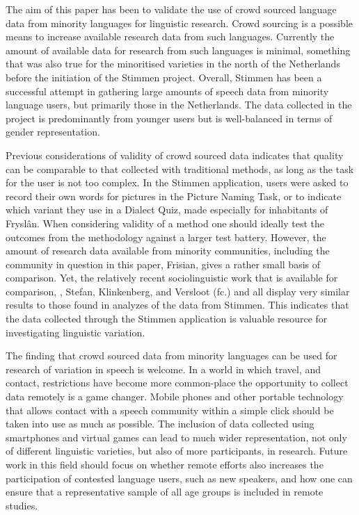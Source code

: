 \documentclass[output=paper,hidelinks]{langscibook}
\begin{document}
The aim of this paper has been to validate the use of crowd sourced language data from minority languages for linguistic research. Crowd sourcing is a possible means to increase available research data from such languages. Currently the amount of available data for research from such languages is minimal, something that was also true for the minoritised varieties in the north of the Netherlands before the initiation of the Stimmen project. Overall, Stimmen has been a successful attempt in gathering large amounts of speech data from minority language users, but primarily those in the Netherlands. The data collected in the project is predominantly from younger users but is well-balanced in terms of gender representation.

Previous considerations of validity of crowd sourced data indicates that quality can be comparable to that collected with traditional methods, as long as the task for the user is not too complex. In the Stimmen application, users were asked to record their own words for pictures in the Picture Naming Task, or to indicate which variant they use in a Dialect Quiz, made especially for inhabitants of Fryslân. When considering validity of a method one should ideally test the outcomes from the methodology against a larger test battery. However, the amount of research data available from minority communities, including the community in question in this paper, Frisian, gives a rather small basis of comparison. Yet, the relatively recent sociolinguistic work that is available for comparison, \citet{HiltonWeening2014}, Stefan, Klinkenberg, and Versloot (fc.) and \citet{Bezooijen2009} all display very similar results to those found in analyzes of the data from Stimmen. This indicates that the data collected through the Stimmen application is valuable resource for investigating linguistic variation.

The finding that crowd sourced data from minority languages can be used for research of variation in speech is welcome. In a world in which travel, and contact, restrictions have become more common-place the opportunity to collect data remotely is a game changer. Mobile phones and other portable technology that allows contact with a speech community within a simple click should be taken into use as much as possible. The inclusion of data collected using smartphones and virtual games can lead to much wider representation, not only of different linguistic varieties, but also of more participants, in research. Future work in this field should focus on whether remote efforts also increases the participation of contested language users, such as new speakers, and how one can ensure that a representative sample of all age groups is included in remote studies.


\sloppy\printbibliography[heading=subbibliography,notkeyword=this]
\end{document}
